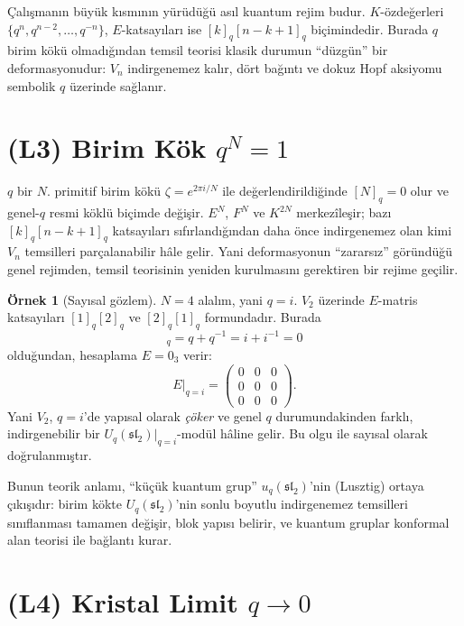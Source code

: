 \documentclass[12pt,a4paper,fleqn]{report}
\newcommand{\normalsemi}{;}
\newcommand{\normalsemi}{\begingroup\semicolonfont;\endgroup}
\numberwithin{equation}{chapter}
\theoremstyle{plain}
\theoremstyle{definition}
\newtheorem{example}[theorem]{Örnek}
\renewcommand{\sl}{\mathfrak{sl}}
\newcommand{\Uq}{U_q(\sl_2)}
\newcommand{\qint}[1]{[#1]_q}
\begin{document}
Çalışmanın büyük kısmının yürüdüğü asıl kuantum rejim budur. $K$-özdeğerleri
$\{q^n, q^{n-2}, \dots, q^{-n}\}$, $E$-katsayıları ise $\qint{k}\qint{n-k+1}$
biçimindedir. Burada $q$ birim kökü olmadığından temsil teorisi klasik durumun
``düzgün'' bir deformasyonudur: $V_n$ indirgenemez kalır, dört bağıntı ve dokuz
Hopf aksiyomu sembolik $q$ üzerinde sağlanır.

\section{(L3) Birim Kök $q^N = 1$}

$q$ bir $N$. primitif birim kökü $\zeta = e^{2\pi i/N}$ ile değerlendirildiğinde
$\qint{N}=0$ olur ve genel-$q$ resmi köklü biçimde değişir. $E^N$, $F^N$ ve
$K^{2N}$ merkezîleşir\normalsemi{} bazı $\qint{k}\qint{n-k+1}$ katsayıları sıfırlandığından
daha önce indirgenemez olan kimi $V_n$ temsilleri parçalanabilir hâle gelir.
Yani deformasyonun ``zararsız'' göründüğü genel rejimden, temsil teorisinin
yeniden kurulmasını gerektiren bir rejime geçilir.

\begin{example}[Sayısal gözlem]
$N = 4$ alalım, yani $q = i$. $V_2$ üzerinde $E$-matris katsayıları
$\qint{1}\qint{2}$ ve $\qint{2}\qint{1}$ formundadır. Burada
\begin{equation}
  \qint{2} = q + q^{-1} = i + i^{-1} = 0
\end{equation}
olduğundan, hesaplama $E = 0_3$ verir:
\begin{equation}
  E\big|_{q=i} = \begin{pmatrix} 0 & 0 & 0 \\ 0 & 0 & 0 \\ 0 & 0 & 0 \end{pmatrix}.
\end{equation}
Yani $V_2$, $q = i$'de yapısal olarak \emph{çöker} ve genel $q$
durumundakinden farklı, indirgenebilir bir $\Uq|_{q=i}$-modül hâline
gelir. Bu olgu 
ile sayısal olarak doğrulanmıştır.
\end{example}

Bunun teorik anlamı, ``küçük kuantum grup'' $u_q(\sl_2)$'nin (Lusztig)
ortaya çıkışıdır: birim kökte $\Uq$'nin sonlu boyutlu indirgenemez
temsilleri sınıflanması tamamen değişir, blok yapısı belirir, ve kuantum
gruplar konformal alan teorisi ile bağlantı kurar.

\section{(L4) Kristal Limit $q \to 0$}
\end{document}
